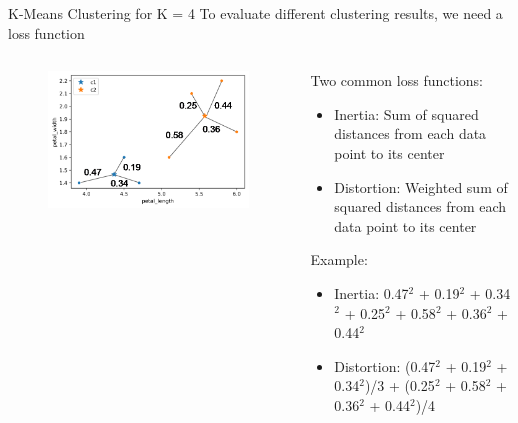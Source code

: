 \documentclass[aspectratio=169]{../latex_main/tntbeamer}  %
\begin{document}
	
	\begin{frame}{K-Means Clustering for K = 4}
	    To evaluate different clustering results, we need a loss function
	    \begin{columns}
	        \begin{column}{.5\textwidth}
	                \begin{figure}
	                    \centering
	                    \includegraphics[scale=.5]{Bild23}
	                \end{figure}
	        \end{column}
	        
	        \begin{column}{.5\textwidth}
	                Two common loss functions:
	                \begin{itemize}
	                    \item Inertia: Sum of squared distances from each data point to its center
	                    \item Distortion: Weighted sum of squared distances from each data point to its center
	                \end{itemize}
	                Example: 
	                \begin{itemize}
	                    \item Inertia: 0.47$^2$ + 0.19$^2$ + 0.34$^2$   + 0.25$^2$ + 0.58$^2$ + 0.36$^2$ + 0.44$^2$
	                    \item Distortion: (0.47$^2$ + 0.19$^2$ + 0.34$^2$)/3 + (0.25$^2$ + 0.58$^2$ + 0.36$^2$ + 0.44$^2$)/4

	                \end{itemize}
	        \end{column}
	    \end{columns}
	\end{frame}
	
\end{document}
